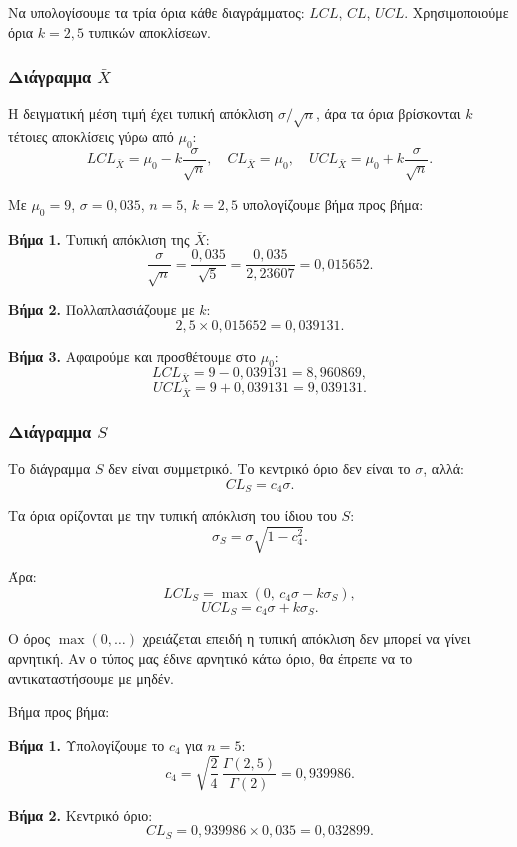 \documentclass[12pt,a4paper]{article}
\begin{document}
Να υπολογίσουμε τα τρία όρια κάθε διαγράμματος: \(LCL\), \(CL\), \(UCL\).
Χρησιμοποιούμε όρια \(k=2{,}5\) τυπικών αποκλίσεων.

\subsubsection*{Διάγραμμα \(\bar X\)}

Η δειγματική μέση τιμή έχει τυπική απόκλιση \(\sigma/\sqrt n\), άρα τα όρια
βρίσκονται \(k\) τέτοιες αποκλίσεις γύρω από \(\mu_0\):
\[
    LCL_{\bar X}=\mu_0-k\frac{\sigma}{\sqrt n},\quad
    CL_{\bar X}=\mu_0,\quad
    UCL_{\bar X}=\mu_0+k\frac{\sigma}{\sqrt n}.
\]

Με \(\mu_0=9\), \(\sigma=0{,}035\), \(n=5\), \(k=2{,}5\) υπολογίζουμε
βήμα προς βήμα:

\textbf{Βήμα 1.} Τυπική απόκλιση της \(\bar X\):
\[
    \frac{\sigma}{\sqrt n}=\frac{0{,}035}{\sqrt 5}=\frac{0{,}035}{2{,}23607}=0{,}015652.
\]

\textbf{Βήμα 2.} Πολλαπλασιάζουμε με \(k\):
\[
    2{,}5\times 0{,}015652=0{,}039131.
\]

\textbf{Βήμα 3.} Αφαιρούμε και προσθέτουμε στο \(\mu_0\):
\[
    LCL_{\bar X}=9-0{,}039131=8{,}960869,
\]
\[
    UCL_{\bar X}=9+0{,}039131=9{,}039131.
\]

\subsubsection*{Διάγραμμα \(S\)}

Το διάγραμμα \(S\) δεν είναι συμμετρικό. Το κεντρικό όριο δεν είναι το
\(\sigma\), αλλά:
\[
    CL_S=c_4\sigma.
\]

Τα όρια ορίζονται με την τυπική απόκλιση του ίδιου του \(S\):
\[
    \sigma_S=\sigma\sqrt{1-c_4^2}.
\]

Άρα:
\[
    LCL_S=\max(0,\,c_4\sigma-k\sigma_S),
\]
\[
    UCL_S=c_4\sigma+k\sigma_S.
\]

\begin{intuition}
Ο όρος \(\max(0,\ldots)\) χρειάζεται επειδή η τυπική απόκλιση δεν μπορεί να
γίνει αρνητική. Αν ο τύπος μας έδινε αρνητικό κάτω όριο, θα έπρεπε να το
αντικαταστήσουμε με μηδέν.
\end{intuition}

Βήμα προς βήμα:

\textbf{Βήμα 1.} Υπολογίζουμε το \(c_4\) για \(n=5\):
\[
    c_4=\sqrt{\frac{2}{4}}\,\frac{\Gamma(2{,}5)}{\Gamma(2)}
    =0{,}939986.
\]

\textbf{Βήμα 2.} Κεντρικό όριο:
\[
    CL_S=0{,}939986\times 0{,}035=0{,}032899.
\]
\end{document}

